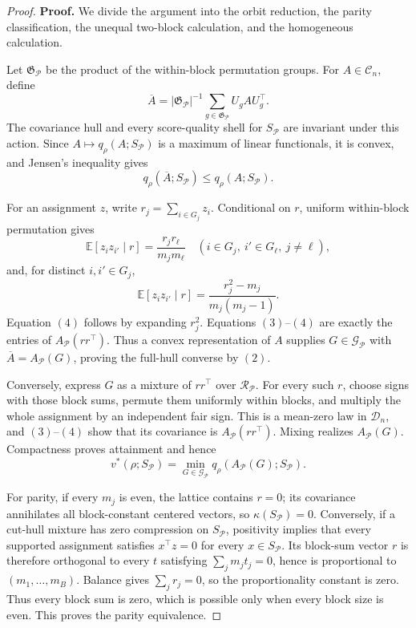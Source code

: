 \documentclass{article}
\begin{document}
\begin{proof}
\textbf{Proof.}
We divide the argument into the orbit reduction, the parity classification, the unequal two-block calculation, and the homogeneous calculation.

Let \(\mathfrak G_{\mathcal P}\) be the product of the within-block permutation groups.  For \(A\in\mathcal C_n\), define
\[
\overline A=|\mathfrak G_{\mathcal P}|^{-1}
\sum_{g\in\mathfrak G_{\mathcal P}}U_gAU_g^\top.
\tag{1}
\]
The covariance hull and every score-quality shell for \(S_{\mathcal P}\) are invariant under this action.  Since \(A\mapsto q_\rho(A;S_{\mathcal P})\) is a maximum of linear functionals, it is convex, and Jensen's inequality gives
\[
q_\rho(\overline A;S_{\mathcal P})\leq q_\rho(A;S_{\mathcal P}).
\tag{2}
\]

For an assignment \(z\), write \(r_j=\sum_{i\in G_j}z_i\).  Conditional on \(r\), uniform within-block permutation gives
\[
\mathbb E[z_i z_{i'}\mid r]=\frac{r_jr_\ell}{m_jm_\ell}
\quad
(i\in G_j,\ i'\in G_\ell,\ j\ne\ell),
\tag{3}
\]
and, for distinct \(i,i'\in G_j\),
\[
\mathbb E[z_i z_{i'}\mid r]
=\frac{r_j^2-m_j}{m_j(m_j-1)}.
\tag{4}
\]
Equation \((4)\) follows by expanding \(r_j^2\).  Equations \((3)\)--\((4)\) are exactly the entries of \(A_{\mathcal P}(rr^\top)\).  Thus a convex representation of \(A\) supplies \(G\in\mathcal G_{\mathcal P}\) with \(\overline A=A_{\mathcal P}(G)\), proving the full-hull converse by \((2)\).

Conversely, express \(G\) as a mixture of \(rr^\top\) over \(\mathcal R_{\mathcal P}\).  For every such \(r\), choose signs with those block sums, permute them uniformly within blocks, and multiply the whole assignment by an independent fair sign.  This is a mean-zero law in \(\mathcal D_n\), and \((3)\)--\((4)\) show that its covariance is \(A_{\mathcal P}(rr^\top)\).  Mixing realizes \(A_{\mathcal P}(G)\).  Compactness proves attainment and hence
\[
v^*(\rho;S_{\mathcal P})
=\min_{G\in\mathcal G_{\mathcal P}}
q_\rho(A_{\mathcal P}(G);S_{\mathcal P}).
\tag{5}
\]

For parity, if every \(m_j\) is even, the lattice contains \(r=0\); its covariance annihilates all block-constant centered vectors, so \(\kappa(S_{\mathcal P})=0\).  Conversely, if a cut-hull mixture has zero compression on \(S_{\mathcal P}\), positivity implies that every supported assignment satisfies \(x^\top z=0\) for every \(x\in S_{\mathcal P}\).  Its block-sum vector \(r\) is therefore orthogonal to every \(t\) satisfying \(\sum_jm_jt_j=0\), hence is proportional to \((m_1,\ldots,m_B)\).  Balance gives \(\sum_jr_j=0\), so the proportionality constant is zero.  Thus every block sum is zero, which is possible only when every block size is even.  This proves the parity equivalence.


\end{proof}
\end{document}
